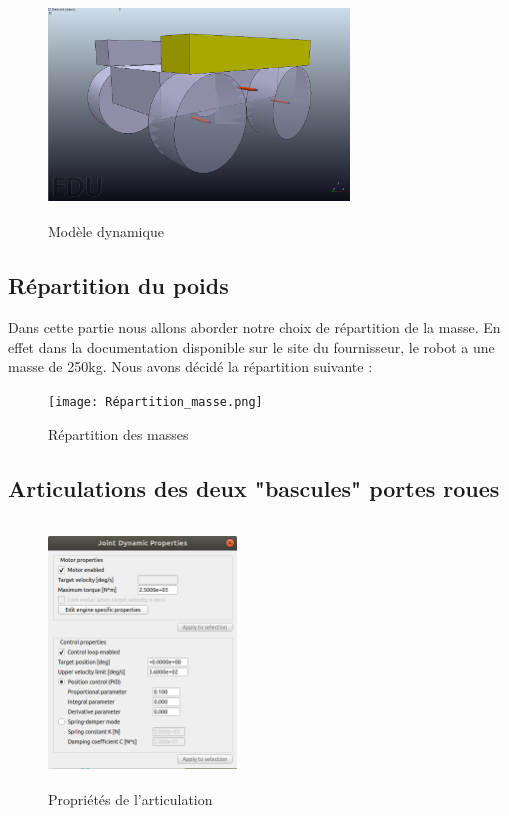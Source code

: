 \documentclass[12pt, openany]{report}
\begin{document}
\begin{figure}[H]
     \centering
     \includegraphics[width=8cm, height=6cm]{sim_dyn.png}
     \caption{Modèle dynamique}
     \label{fig:mdyn}
\end{figure}

\subsection{Répartition du poids}
Dans cette partie nous allons aborder notre choix de répartition de la masse. En effet dans la documentation disponible sur le site du fournisseur, le robot a une masse de 250kg. Nous avons décidé la répartition suivante :
\begin{figure}[H]
     \centering
     \texttt{[image: Répartition\_masse.png]}
     \caption{Répartition des masses}
     \label{fig:masse}     
\end{figure}

\subsection{Articulations des deux "bascules" portes roues}
\label{sec:bascules}
\begin{figure}
    \begin{center}
        \includegraphics[width=5cm, height=7cm]{joint.png}
    \end{center}
    \caption{Propriétés de l'articulation}
    \label{fig:joint}     
\end{figure}
\end{document}
